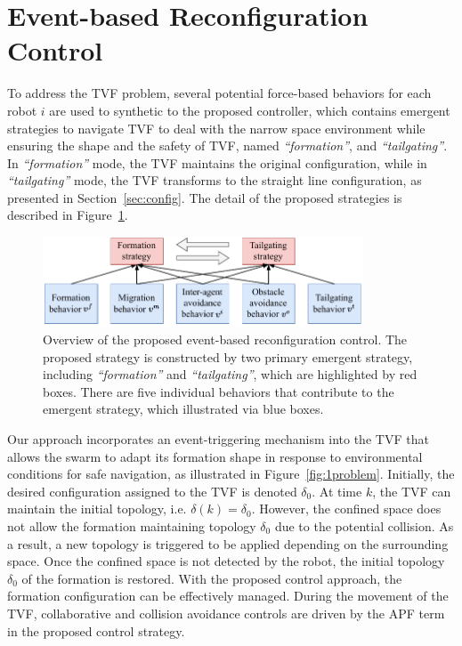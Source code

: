 \section{Event-based Reconfiguration Control}\label{sec3}

To address the TVF problem, several potential force-based behaviors for each robot $i$ are used to synthetic to the proposed controller, which contains emergent strategies to navigate TVF to deal with the narrow space environment while ensuring the shape and the safety of TVF, named \textit{``formation''}, and \textit{``tailgating''}. In \textit{``formation''} mode, the TVF maintains the original configuration, while in \textit{``tailgating''} mode, the TVF transforms to the straight line configuration, as presented in Section~\ref{sec:config}. The detail of the proposed strategies is described in Figure~\ref{fig:1control_diagram}.

\begin{figure}
    \centering
    \includegraphics[width=0.85\textwidth]{paper2/images/control_diagram.pdf}
    \caption{Overview of the proposed event-based reconfiguration control. The proposed strategy is constructed by two primary emergent strategy, including \textit{``formation''} and \textit{``tailgating''}, which are highlighted by red boxes. There are five individual behaviors that contribute to the emergent strategy, which illustrated via blue boxes.}
    \label{fig:1control_diagram}
\end{figure}

Our approach incorporates an event-triggering mechanism into the TVF that allows the swarm to adapt its formation shape in response to environmental conditions for safe navigation, as illustrated in Figure~\ref{fig:1problem}. Initially, the desired configuration assigned to the TVF is denoted $\delta_0$. At time $k$, the TVF can maintain the initial topology, i.e. $\delta(k)=\delta_0$. However, the confined space does not allow the formation maintaining topology $\delta_0$ due to the potential collision. As a result, a new topology is triggered to be applied depending on the surrounding space. Once the confined space is not detected by the robot, the initial topology $\delta_0$ of the formation is restored. With the proposed control approach, the formation configuration can be effectively managed. During the movement of the TVF, collaborative and collision avoidance controls are driven by the APF term in the proposed control strategy.


